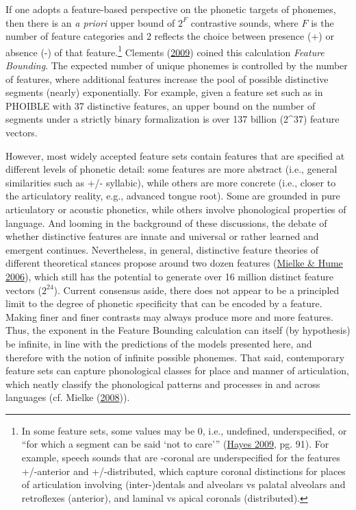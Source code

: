 \documentclass[
]{article}
\begin{document}
If one adopts a feature-based perspective on the phonetic targets of
phonemes, then there is an \emph{a priori} upper bound of \(2^F\)
contrastive sounds, where \(F\) is the number of feature categories and
2 reflects the choice between presence (+) or absence (-) of that
feature.\footnote{In some feature sets, some values may be 0, i.e.,
  undefined, underspecified, or ``for which a segment can be said `not
  to care''' (\protect\hyperlink{ref-Hayes2009}{Hayes 2009}, pg. 91).
  For example, speech sounds that are -coronal are underspecified for
  the features +/-anterior and +/-distributed, which capture coronal
  distinctions for places of articulation involving (inter-)dentals and
  alveolars vs palatal alveolars and retroflexes (anterior), and laminal
  vs apical coronals (distributed).} Clements
(\protect\hyperlink{ref-Clements2009}{2009}) coined this calculation
\emph{Feature Bounding}. The expected number of unique phonemes is
controlled by the number of features, where additional features increase
the pool of possible distinctive segments (nearly) exponentially. For
example, given a feature set such as in PHOIBLE with 37 distinctive
features, an upper bound on the number of segments under a strictly
binary formalization is over 137 billion (2\^{}37) feature vectors.

However, most widely accepted feature sets contain features that are
specified at different levels of phonetic detail: some features are more
abstract (i.e., general similarities such as +/- syllabic), while others
are more concrete (i.e., closer to the articulatory reality, e.g.,
advanced tongue root). Some are grounded in pure articulatory or
acoustic phonetics, while others involve phonological properties of
language. And looming in the background of these discussions, the debate
of whether distinctive features are innate and universal or rather
learned and emergent continues. Nevertheless, in general, distinctive
feature theories of different theoretical stances propose around two
dozen features (\protect\hyperlink{ref-MielkeHume2006}{Mielke \& Hume
2006}), which still has the potential to generate over 16 million
distinct feature vectors (\(2^24\)). Current consensus aside, there does
not appear to be a principled limit to the degree of phonetic
specificity that can be encoded by a feature. Making finer and finer
contrasts may always produce more and more features. Thus, the exponent
in the Feature Bounding calculation can itself (by hypothesis) be
infinite, in line with the predictions of the models presented here, and
therefore with the notion of infinite possible phonemes. That said,
contemporary feature sets can capture phonological classes for place and
manner of articulation, which neatly classify the phonological patterns
and processes in and across languages (cf. Mielke
(\protect\hyperlink{ref-Mielke2008}{2008})).
\end{document}
